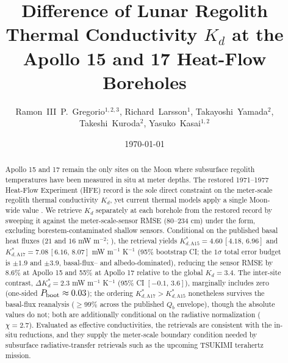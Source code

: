 \documentclass[11pt]{article}
\title{\bfseries  Difference of Lunar Regolith Thermal Conductivity $K_d$ at the Apollo 15 and 17 Heat-Flow Boreholes}
\author{%
  Ramon~III~P.~Gregorio$^{1,2,3}$,\quad
  Richard~Larsson$^{1}$,\quad
  Takayoshi~Yamada$^{2}$,\quad
  Takeshi~Kuroda$^{2}$,\quad
  Yasuko~Kasai$^{1,2}$%
}
\date{\today}
\begin{document}
\linenumbers
\maketitle



\begin{abstract}
\noindent
Apollo 15 and 17 remain the only sites on the Moon where subsurface
regolith temperatures have been measured in situ at meter depths. The restored
1971--1977 Heat-Flow Experiment (HFE) record is the sole direct
constraint on the meter-scale regolith thermal conductivity $K_d$, yet
current thermal models apply a single Moon-wide value
\citep{hayne2017,martinez2021}. We retrieve $K_d$ separately at each
borehole from the restored record \citep{nagihara2018} by sweeping it
against the meter-scale-sensor RMSE (80--234 cm) under the
\citet{hayne2017} form, excluding borestem-contaminated shallow
sensors. Conditional on the published basal heat fluxes ($21$ and $16$
mW m$^{-2}$; \citealp{langseth1976}), the retrieval yields
$K_{d,\mathrm{A15}}^{*}=4.60\,[4.18,\,6.96]$ and
$K_{d,\mathrm{A17}}^{*}=7.08\,[6.16,\,8.07]$ mW m$^{-1}$ K$^{-1}$
(95\% bootstrap CI; the $1\sigma$ total error budget is $\pm 1.9$ and
$\pm 3.9$, basal-flux-- and albedo-dominated), reducing the sensor RMSE
by 8.6\% at Apollo 15 and
55\% at Apollo 17 relative to the global $K_d=3.4$. The inter-site
contrast, $\Delta K_d^{*}=2.3$ mW m$^{-1}$ K$^{-1}$ (95\%
CI $[-0.1,\,3.6]$), marginally includes zero
(one-sided $P_{\rm boot}\approx 0.03$); the ordering
$K_{d,\mathrm{A17}}^{*}\!>\!K_{d,\mathrm{A15}}^{*}$ nonetheless survives
the basal-flux reanalysis ($\ge$99\% across the published $Q_b$
envelope), though the absolute values do not; both are additionally
conditional on the \citet{hayne2017} radiative normalization
($\chi=2.7$). Evaluated as effective conductivities, the retrievals are
consistent with the \citet{langseth1976} in-situ reductions, and they
supply the meter-scale boundary condition needed by subsurface
radiative-transfer retrievals such as the upcoming TSUKIMI terahertz
mission.
\end{abstract}
\end{document}
